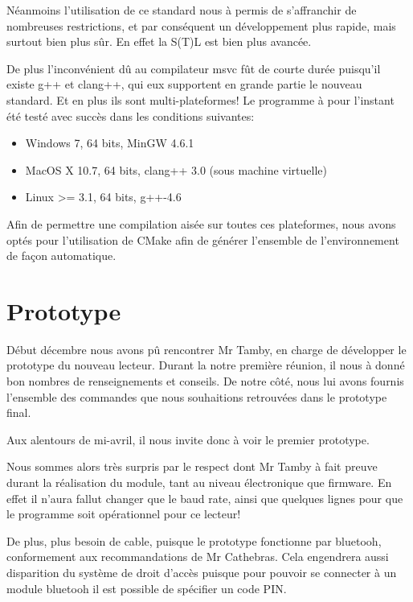     Néanmoins l'utilisation de ce standard nous à permis de s'affranchir de nombreuses
restrictions, et par conséquent un développement plus rapide, mais surtout bien
plus sûr. En effet la S(T)L est bien plus avancée.

    De plus l'inconvénient dû au compilateur msvc fût de courte durée puisqu'il
existe g++ et clang++, qui eux supportent en grande partie le nouveau standard.
Et en plus ils sont multi-plateformes! Le programme à pour l'instant été testé 
avec succès dans les conditions suivantes:

    \begin{itemize}
        \item Windows 7, 64 bits, MinGW 4.6.1
        \item MacOS X 10.7, 64 bits, clang++ 3.0 (sous machine virtuelle)
        \item Linux >= 3.1, 64 bits, g++-4.6
    \end{itemize}

    Afin de permettre une compilation aisée sur toutes ces plateformes, nous avons
optés pour l'utilisation de CMake afin de générer l'ensemble de l'environnement de
façon automatique.



\section{Prototype}
    Début décembre nous avons pû rencontrer Mr Tamby, en charge de développer le
prototype du nouveau lecteur. Durant la notre première réunion, il nous à donné
bon nombres de renseignements et conseils. De notre côté, nous lui avons fournis
l'ensemble des commandes que nous souhaitions retrouvées dans le prototype final.

    Aux alentours de mi-avril, il nous invite donc à voir le premier prototype.


    Nous sommes alors très surpris par le respect dont Mr Tamby à fait preuve
durant la réalisation du module, tant au niveau électronique que firmware.
En effet il n'aura fallut changer que le baud rate, ainsi que quelques lignes
pour que le programme soit opérationnel pour ce lecteur!

    De plus, plus besoin de cable, puisque le prototype fonctionne par bluetooh,
conformement aux recommandations de Mr Cathebras. Cela engendrera aussi disparition
du système de droit d'accès puisque pour pouvoir se connecter à un module bluetooh
il est possible de spécifier un code PIN.



